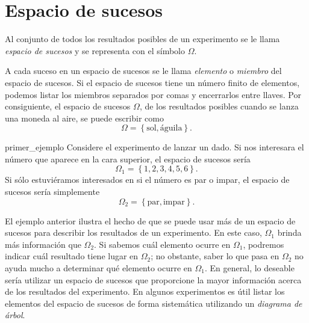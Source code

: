 \section{Espacio de sucesos}

\begin{definicion}{}{}
    Al conjunto de todos los resultados posibles de un experimento se le llama \emph{espacio de sucesos} y se representa con el símbolo $\Omega$.
\end{definicion}

A cada suceso en un espacio de sucesos se le llama \emph{elemento} o \emph{miembro} del espacio de sucesos. Si el espacio de sucesos tiene un número finito de elementos, podemos listar los miembros separados por comas y encerrarlos entre llaves. Por consiguiente, el espacio de sucesos $\Omega$, de los resultados posibles cuando se lanza una moneda al aire, se puede escribir como
$$\Omega = \left\{ \text{sol}, \text{águila} \right\} .$$
\begin{examplebox}{}{primer_ejemplo}
    Considere el experimento de lanzar un dado. Si nos interesara el número que aparece en la cara superior, el espacio de sucesos sería
    $$\Omega_1 = \left\{ 1, 2, 3, 4, 5, 6 \right\}.$$
    Si sólo estuviéramos interesados en si el número es par o impar, el espacio de sucesos sería simplemente
    $$\Omega_2 = \left\{ \text{par}, \text{impar} \right\}.$$
\end{examplebox}

El ejemplo anterior ilustra el hecho de que se puede usar más de un espacio de sucesos para describir los resultados de un experimento. En este caso, $\Omega_1$ brinda más información que $\Omega_2$. Si sabemos cuál elemento ocurre en $\Omega_1$, podremos indicar cuál resultado tiene lugar en $\Omega_2$; no obstante, saber lo que pasa en $\Omega_2$ no ayuda mucho a determinar qué elemento ocurre en $\Omega_1$. En general, lo deseable sería utilizar un espacio de sucesos que proporcione la mayor información acerca de los resultados del experimento. En algunos experimentos es útil listar los elementos del espacio de sucesos de forma sistemática utilizando un \emph{diagrama de árbol}.

